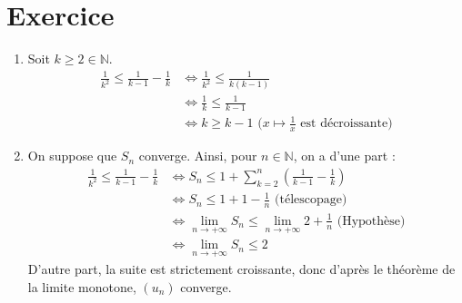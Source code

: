 \documentclass{report}
\begin{document}
\setcounter{section}{1}
\section{Exercice}
\begin{enumerate}
    \item Soit $k \geq 2 \in \mathbb{N}$. \\
    \begin{align*}
        \frac{1}{k^2} \leq \frac{1}{k-1} - \frac{1}{k} &\Leftrightarrow \frac{1}{k^2} \leq \frac{1}{k(k-1)} \\
        &\Leftrightarrow \frac{1}{k} \leq \frac{1}{k-1} \\
        &\Leftrightarrow k \geq k-1 \text{ ($x \mapsto \frac{1}{x}$ est décroissante)}
    \end{align*}

    \item On suppose que $S_n$ converge. Ainsi, pour $n \in \mathbb{N}$, on a d'une part : 
    \begin{align*}
        \frac{1}{k^2} \leq \frac{1}{k-1} - \frac{1}{k}
        &\Leftrightarrow S_n \leq 1 + \sum_{k=2}^{n} \left( \frac{1}{k-1} - \frac{1}{k} \right) \\
        &\Leftrightarrow S_n \leq 1 + 1 - \frac{1}{n} \text{ (télescopage)} \\
        &\Leftrightarrow \lim_{n \to +\infty} S_n \leq \lim_{n \to +\infty} 2 + \frac{1}{n} \text{ (Hypothèse)}\\
        &\Leftrightarrow \lim_{n \to +\infty} S_n \leq 2
    \end{align*}
    D'autre part, la suite est strictement croissante, donc d'après le théorème de la limite monotone, $(u_n)$ converge. 
\end{enumerate}
\end{document}
